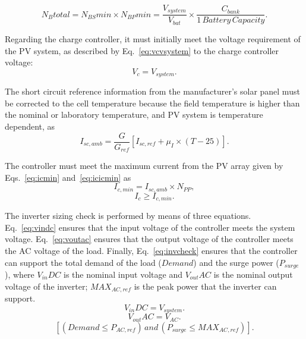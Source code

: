 \documentclass[review]{elsarticle}
\begin{document}
\begin{equation}
\label{eq:Nbtotal}
N_{B}total = N_{BS}min \times N_{BP}min = \dfrac{V_{system}}{V_{bat}} \times \dfrac{C_{bank}}{1 \,Battery \, Capacity}.
\end{equation}

Regarding the charge controller, it must initially meet the voltage requirement of the PV system, as described by Eq.~\eqref{eq:vcvsystem} to the charge controller voltage: 
\begin{equation}
\label{eq:vcvsystem}
V_{c} = V_{system}.
\end{equation}

The short circuit reference information from the manufacturer's solar panel must be corrected 
to the cell temperature because the field temperature is higher than the nominal or laboratory temperature, 
and PV system is temperature dependent, as 
%
\begin{equation}
\label{eq:iscamb}
I_{sc,amb} = \dfrac{G}{G_{ref}} \left[ I_{sc,ref} + \mu_{I} \times (T-25) \right]. 
\end{equation}

The controller must meet the maximum current from the PV array given by Eqs.~\eqref{eq:icmin} and~\eqref{eq:icicmin} as
%
\begin{equation}
\label{eq:icmin}
I_{c,min} = I_{sc,amb} \times N_{PP},
\end{equation}
%
\begin{equation}
\label{eq:icicmin}
I_{c} \geq I_{c,min}.
\end{equation}

The inverter sizing check is performed by means of three equations. Eq.~\eqref{eq:vindc} ensures that 
the input voltage of the controller meets the system voltage. Eq.~\eqref{eq:voutac} ensures that the 
output voltage of the controller meets the AC voltage of the load. Finally, Eq.~\eqref{eq:invcheck} ensures that 
the controller can support the total demand of the load ($Demand$) and the surge power ($P_{surge}$), 
where $V_{in}DC$ is the nominal input voltage and $V_{out}AC$ is the nominal output voltage of the inverter; 
$MAX_{AC,ref}$ is the peak power that the inverter can support.
%
\begin{equation}
\label{eq:vindc} 
V_{in}DC = V_{system}.
\end{equation}
%
\begin{equation}
\label{eq:voutac} 
V_{out}AC = V_{AC}.
\end{equation}
%
\begin{equation}
\label{eq:invcheck} 
\left[ (Demand \leq P_{AC,ref}) \, and \, (P_{surge} \leq MAX_{AC,ref}) \right].
\end{equation}
\end{document}
